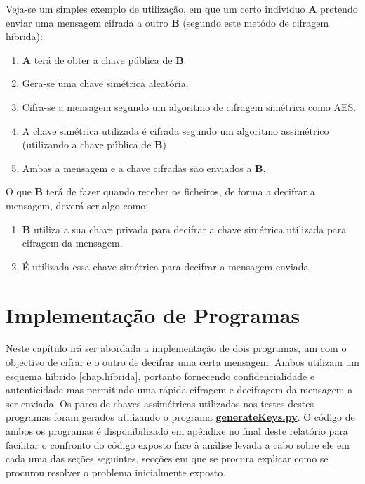 \documentclass[a4paper,11pt,openright,oneside]{report}
\begin{document}
Veja-se um simples exemplo de utilização, em que um certo indivíduo \textbf{A} pretendo enviar uma mensagem cifrada a outro \textbf{B} (segundo este metódo de cifragem híbrida):

\begin{enumerate}
\item \textbf{A} terá de obter a chave pública de \textbf{B}.
\item Gera-se uma chave simétrica aleatória.
\item Cifra-se a mensagem segundo um algoritmo de cifragem simétrica como AES.
\item A chave simétrica utilizada é cifrada segundo um algoritmo assimétrico (utilizando a chave pública de \textbf{B})
\item Ambas a mensagem e a chave cifradas são enviados a \textbf{B}.
\end{enumerate}

O que \textbf{B} terá de fazer quando receber os ficheiros, de forma a decifrar a mensagem, deverá ser algo como:

\begin{enumerate}
\item \textbf{B} utiliza a sua chave privada para decifrar a chave simétrica utilizada para cifragem da mensagem.
\item É utilizada essa chave simétrica para decifrar a mensagem enviada.
\end{enumerate}

\chapter{Implementação de Programas}
\label{chap.programas}

Neste capítulo irá ser abordada a implementação de dois programas, um com o objectivo de cifrar e o outro de decifrar uma certa mensagem. Ambos utilizam um esquema híbrido \ref{chap.híbrida}, portanto fornecendo confidencialidade e autenticidade mas permitindo uma rápida cifragem e decifragem da mensagem a ser enviada. Os pares de chaves assimétricas utilizados nos testes destes programas foram gerados utilizando o programa \href{run:../Python/KeysGenerator/generateKeys.py}{\textbf{generateKeys.py}}. O código de ambos os programas é disponibilizado em apêndixe no final deste relatório para facilitar o confronto do código exposto face à análise levada a cabo sobre ele em cada uma das seções seguintes, secções em que se procura explicar como se procurou resolver o problema inicialmente exposto.\\
\end{document}
